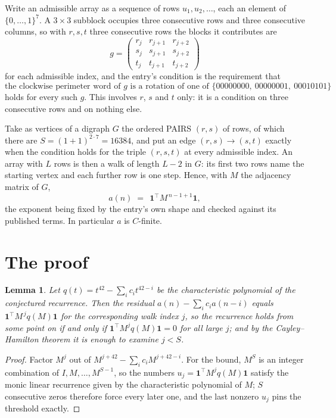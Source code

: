 \documentclass[11pt,a4paper]{article}
\theoremstyle{plain}
\newtheorem{lemma}[theorem]{Lemma}
\theoremstyle{definition}
\begin{document}
Write an admissible array as a sequence of rows $u_1,u_2,\dots$, each an element of
$\{0,\dots,1\}^{7}$. A $3\times3$ subblock occupies three consecutive rows and
three consecutive columns, so with $r,s,t$ three consecutive rows the blocks it
contributes are
\[
g=\begin{pmatrix}r_j&r_{j+1}&r_{j+2}\\ s_j&s_{j+1}&s_{j+2}\\ t_j&t_{j+1}&t_{j+2}\end{pmatrix}
\]
for each admissible index, and the entry's condition is the requirement that
\[
\text{the clockwise perimeter word of }g\text{ is a rotation of one of }\{00000000,\ 00000001,\ 00010101\}
\]
holds for every such $g$. This involves $r$, $s$ and $t$ only: it is a condition on
three consecutive rows and on nothing else.

Take as vertices of a digraph $G$ the ordered PAIRS $(r,s)$ of rows, of which there are
$S=(1+1)^{2\cdot7}=16384$, and put an edge $(r,s)\to(s,t)$ exactly when the condition
holds for the triple $(r,s,t)$ at every admissible index. An array with $L$ rows is then a
walk of length $L-2$ in $G$: its first two rows name the starting vertex and each further
row is one step. Hence, with $M$ the adjacency matrix of $G$,
\[
a(n)\;=\;\,\mathbf{1}^{\!\top}M^{\,n-1+1}\mathbf{1},
\]
the exponent being fixed by the entry's own shape and checked against its published terms.
In particular $a$ is $C$-finite.

\section{The proof}

\begin{lemma}\label{lem:crit}
Let $q(t)=t^{42}-\sum_i c_it^{42-i}$ be the characteristic polynomial of the
conjectured recurrence. Then the residual $a(n)-\sum_ic_ia(n-i)$ equals
$\mathbf{1}^{\!\top}M^{\,j}q(M)\mathbf{1}$ for the corresponding walk index
$j$, so the recurrence holds from some point on if and only if
$\mathbf{1}^{\!\top}M^{j}q(M)\mathbf{1}=0$ for all large $j$; and by the
Cayley--Hamilton theorem it is enough to examine $j<S$.
\end{lemma}

\begin{proof}
Factor $M^{j}$ out of $M^{j+42}-\sum_ic_iM^{j+42-i}$. For the bound, $M^{S}$
is an integer combination of $I,M,\dots,M^{S-1}$, so the numbers
$u_j=\mathbf{1}^{\!\top}M^{j}q(M)\mathbf{1}$ satisfy the monic linear recurrence given by
the characteristic polynomial of $M$; $S$ consecutive zeros therefore force every later one,
and the last nonzero $u_j$ pins the threshold exactly.
\end{proof}
\end{document}
